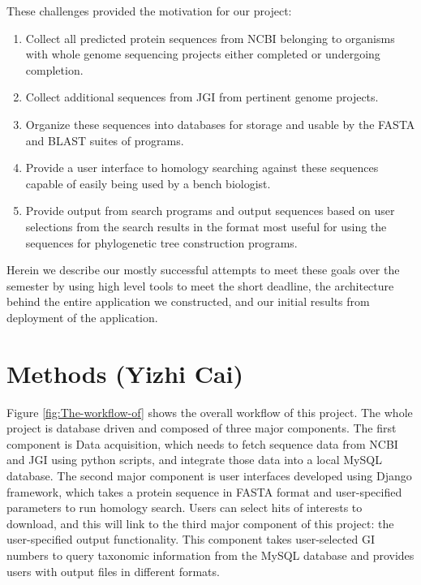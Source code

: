 \documentclass[11pt,letterpaper,twoside,english]{article}
\begin{document}
These challenges provided the motivation for our project:
\begin{enumerate}
    \item Collect all predicted protein sequences from NCBI belonging to
        organisms with whole genome sequencing projects either completed or
        undergoing completion.
    \item Collect additional sequences from JGI from pertinent genome
        projects.
    \item Organize these sequences into databases for storage and usable by
        the FASTA and BLAST suites of programs.
    \item Provide a user interface to homology searching against these
        sequences capable of easily being used by a bench biologist.
    \item Provide output from search programs and output sequences based on
        user selections from the search results in the format most useful for
        using the sequences for phylogenetic tree construction programs.
\end{enumerate}

Herein we describe our mostly successful attempts to meet these goals over the
semester by using high level tools to meet the short deadline, the
architecture behind the entire application we constructed, and our initial
results from deployment of the application.

\section{Methods (Yizhi Cai)}

Figure \ref{fig:The-workflow-of} shows the overall workflow of this
project. The whole project is database driven and composed of three
major components. The first component is Data acquisition, which needs
to fetch sequence data from NCBI and JGI using python scripts, and
integrate those data into a local MySQL database. The second major
component is user interfaces developed using Django framework, which
takes a protein sequence in FASTA format and user-specified parameters
to run homology search. Users can select hits of interests to download,
and this will link to the third major component of this project: the
user-specified output functionality. This component takes user-selected
GI numbers to query taxonomic information from the MySQL database
and provides users with output files in different formats.
\end{document}
